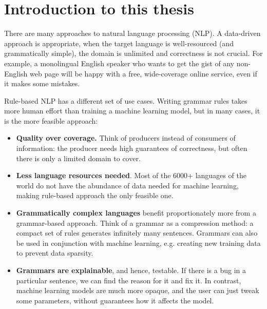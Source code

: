 \chapter{Introduction to this thesis}

There are many approaches to natural language processing (NLP). 
A data-driven approach is appropriate, when the target language is well-resourced (and grammatically simple), the domain is unlimited and correctness is not crucial.
For example, a monolingual English speaker who wants to get the gist of any non-English web page will be happy with a free, wide-coverage online service, even if it makes some mistakes.

Rule-based NLP has a different set of use cases. Writing grammar rules takes more human effort than training a machine learning model, but in many cases, it is the more feasible approach:



\begin{itemize}
\setlength\itemsep{0.25em}
\item \textbf{Quality over coverage.} 
Think of producers instead of consumers of information: the producer needs high guarantees of correctness,
but often there is only a limited domain to cover. %

\item \textbf{Less language resources needed}. Most of the 6000+ languages of the world do not have the abundance of data needed for machine learning, making rule-based approach the only feasible one.

\item \textbf{Grammatically complex languages} benefit proportionately more from a grammar-based approach. 
Think of a grammar as a compression method: a compact set of rules generates infinitely many sentences. 
Grammars can also be used in conjunction with machine learning, e.g. creating new training data to prevent data sparsity.

\item \textbf{Grammars are explainable}, and hence, testable. If there is a bug in a particular sentence, we can find the reason for it and fix it. In contrast, machine learning models are much more opaque, and the user can just tweak some parameters, without guarantees how it affects the model.

\end{itemize}

